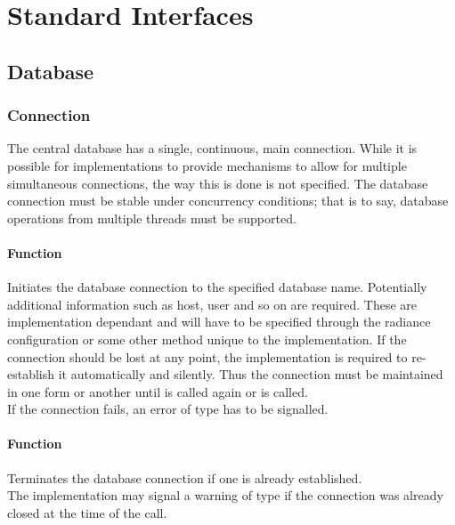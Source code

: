 \chapter{Standard Interfaces} \label{sec:standard interfaces}
\section{Database}
\subsection{Connection}
The central database has a single, continuous, main connection. While it is possible for implementations to provide mechanisms to allow for multiple simultaneous connections, the way this is done is not specified. The database connection must be stable under concurrency conditions; that is to say, database operations from multiple threads must be supported.

\subsubsection{Function }
Initiates the database connection to the specified database name. Potentially additional information such as host, user and so on are required. These are implementation dependant and will have to be specified through the radiance configuration or some other method unique to the implementation. If the connection should be lost at any point, the implementation is required to re-establish it automatically and silently. Thus the connection must be maintained in one form or another until  is called again or  is called. \\

\noindent If the connection fails, an error of type  has to be signalled.

\subsubsection{Function }
Terminates the database connection if one is already established. \\

\noindent The implementation may signal a warning of type  if the connection was already closed at the time of the call.


